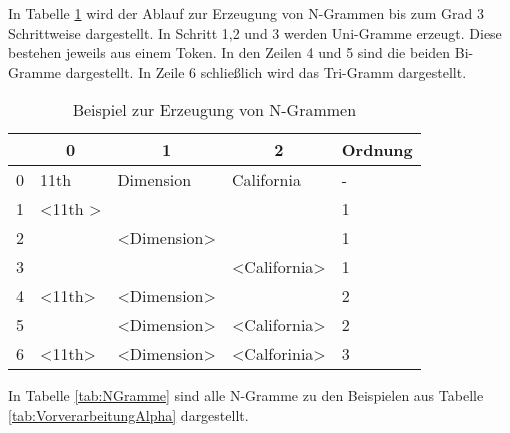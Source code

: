 				In Tabelle \ref{tab:ngramize} wird der Ablauf zur Erzeugung von N-Grammen bis zum Grad 3 Schrittweise dargestellt.
				In Schritt 1,2 und 3 werden Uni-Gramme erzeugt. 
				Diese bestehen jeweils aus einem Token.
				In den Zeilen 4 und 5 sind die beiden Bi-Gramme dargestellt.
				In Zeile 6 schließlich wird das Tri-Gramm dargestellt. 

				\begin{table}[h]
				\centering
				\caption{Beispiel zur Erzeugung von N-Grammen}
				\label{tab:ngramize}
				\begin{tabular}{|c||l|l|l||l|}
				\hline
				 & \multicolumn{1}{c|}{0}    & \multicolumn{1}{c|}{1}         & \multicolumn{1}{c|}{2}          & Ordnung \\ \hline \hline
				0       & 11th                      & Dimension                      & California                      & -       \\ \hline
				1       & \textless 11th \textgreater &                                &                                 & 1       \\ \hline
				2       &                           & \textless Dimension\textgreater &                                 & 1       \\ \hline
				3       &                           &                                & \textless California\textgreater & 1       \\ \hline
				4       & \textless 11th\textgreater & \textless Dimension\textgreater &                                 & 2       \\ \hline
				5       &                           & \textless Dimension\textgreater & \textless California\textgreater & 2       \\ \hline
				6       & \textless 11th\textgreater & \textless Dimension\textgreater & \textless Calforinia\textgreater & 3       \\ \hline
				\end{tabular}
				\end{table}

				 
				
				In Tabelle \ref{tab:NGramme} sind alle N-Gramme zu den Beispielen aus Tabelle \ref{tab:VorverarbeitungAlpha} dargestellt.

